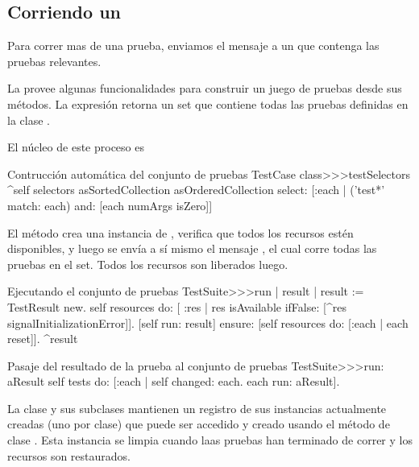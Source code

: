 \documentclass[a4paper,10pt,twoside]{book}
\begin{document}
\subsection{Corriendo un }

Para correr mas de una prueba, enviamos el mensaje  a un  que contenga
las pruebas relevantes.

La  provee algunas funcionalidades para construir un juego de pruebas desde sus m\'etodos.
La expresi\'on  retorna un set que contiene todas las 
pruebas definidas en la clase  .

El n\'ucleo de este proceso es
\begin{method}[testcasetestselectors]{Contrucci\'on autom\'atica del conjunto de pruebas}
TestCase class>>>testSelectors 
	^self selectors asSortedCollection asOrderedCollection select: [:each | 
		('test*' match: each) and: [each numArgs isZero]]
\end{method}

El m\'etodo  crea una instancia de , verifica que todos los
recursos est\'en disponibles, y luego se env\'ia a s\'i mismo el mensaje , 
el cual corre todas las pruebas en el set. Todos los recursos son liberados luego.

\begin{method}[testsuiterun]{Ejecutando el conjunto de pruebas}
TestSuite>>>run
	| result |
 	result := TestResult new.
	self resources do: [ :res |
		res isAvailable ifFalse: [^res signalInitializationError]].
	[self run: result] ensure: [self resources do: [:each | each reset]].
	^result
\end{method}

\begin{method}[testsuiterun:]{Pasaje del resultado de la prueba al conjunto de pruebas}
TestSuite>>>run: aResult
	self tests do: [:each | 
		self changed: each.
		each run: aResult].
\end{method}


La clase  y sus subclases mantienen un registro de sus instancias
actualmente creadas (uno por clase) que puede ser accedido y creado usando el m\'etodo de clase
. Esta instancia se limpia cuando laas pruebas
han terminado de correr y los recursos son restaurados.
\end{document}
